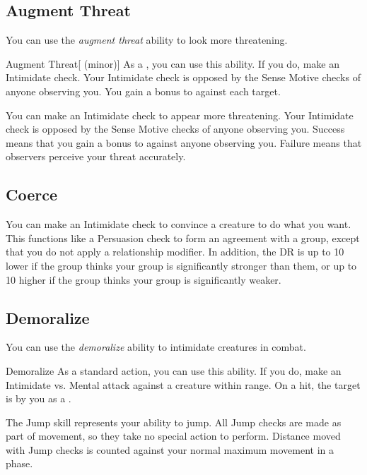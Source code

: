     \subsection{Augment Threat}\label{Augment Threat}
        You can use the \textit{augment threat} ability to look more threatening.
        \begin{ability}{Augment Threat}[ (minor)]
            As a , you can use this ability.
            If you do, make an Intimidate check.
            Your Intimidate check is opposed by the Sense Motive checks of anyone observing you.
            \hit You gain a  bonus to  against each target.
        \end{ability}

        You can make an Intimidate check to appear more threatening.
        Your Intimidate check is opposed by the Sense Motive checks of anyone observing you.
        Success means that you gain a  bonus to  against anyone observing you.
        Failure means that observers perceive your threat accurately.

    \subsection{Coerce}
        You can make an Intimidate check to convince a creature to do what you want. This functions like a Persuasion check to form an agreement with a group, except that you do not apply a relationship modifier. In addition, the DR is up to 10 lower if the group thinks your group is significantly stronger than them, or up to 10 higher if the group thinks your group is significantly weaker.

    \subsection{Demoralize}\label{Demoralize}

        You can use the \textit{demoralize} ability to intimidate creatures in combat.

        \begin{ability}{Demoralize}
            As a standard action, you can use this ability.
            If you do, make an Intimidate vs. Mental attack against a creature within \rngmed range.
            On a hit, the target is \shaken by you as a .
        \end{ability}

\newpage
{}
        The Jump skill represents your ability to jump. All Jump checks are made as part of movement, so they take no special action to perform. Distance moved with Jump checks is counted against your normal maximum movement in a phase.

